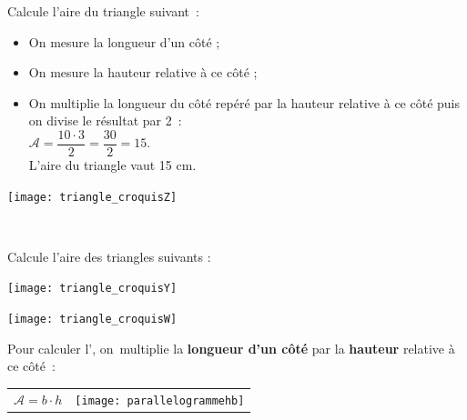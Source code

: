 \vspace{4em}

\begin{methode*1}


 
\begin{exemple*1}
Calcule l’aire du triangle suivant :
\begin{minipage}[c]{0.68\textwidth}
\begin{itemize}
 \item On mesure la longueur d'un côté ;
 \item On mesure la hauteur relative à ce côté ;
 \item On multiplie la longueur du côté repéré par la hauteur relative à ce côté puis on divise le résultat par 2 : \\[0.3em]
$\mathcal{A} = \dfrac{10 \cdot 3}{2} = \dfrac{30}{2} = 15$. \\[0.3em]
L'aire du triangle vaut 15 cm.
 \end{itemize}
 \end{minipage} \hfill%
 \begin{minipage}[c]{0.2\textwidth}
 \texttt{[image: triangle\_croquisZ]}
 \end{minipage} \\
\end{exemple*1}


\exercice 
Calcule l’aire des triangles suivants :
\begin{colenumerate}{2}
 \item
 
 \texttt{[image: triangle\_croquisY]}
 \item
 
 \texttt{[image: triangle\_croquisW]}
 \end{colenumerate}

\end{methode*1}
\newpage

\vspace{2em}

\begin{aconnaitre}
Pour calculer l’, on multiplie la \textbf{\textcolor{H1}{longueur d'un côté}} par la \textbf{\textcolor{C2}{hauteur}} relative à ce côté :

\vspace{1em}

\begin{tabularx}{\textwidth}{XX}
{\large $\mathcal{A} = b \cdot h$} & \texttt{[image: parallelogrammehb]} \\
 \end{tabularx} \\

\end{aconnaitre}


